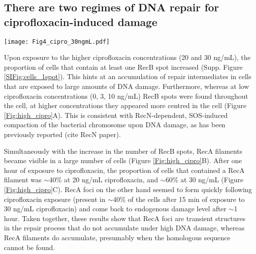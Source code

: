 \subsection*{There are two regimes of DNA repair for ciprofloxacin-induced damage}

\begin{figure*}[htbp]
\begin{center}
\texttt{[image: Fig4\_cipro\_30ngmL.pdf]}
\end{center}
\caption{}
\label{Fig:high_cipro}
\end{figure*}


Upon exposure to the higher ciprofloxacin concentrations (20 and 30 ng/mL), the proportion of cells that contain at least one RecB spot increased (Supp. Figure \ref{SIFig:cells_1spot}). This hints at an accumulation of repair intermediates in cells that are exposed to large amounts of DNA damage. Furthermore, whereas at low ciprofloxacin concentrations (0, 3, 10 ng/mL) RecB spots were found throughout the cell, at higher concentrations they appeared more centred in the cell (Figure \ref{Fig:high_cipro}A). This is consistent with RecN-dependent, SOS-induced compaction of the bacterial chromosome upon DNA damage, as has been previously reported (cite RecN paper).

Simultaneously with the increase in the number of RecB spots, RecA filaments became visible in a large number of cells (Figure \ref{Fig:high_cipro}B). After one hour of exposure to ciprofloxacin, the proportion of cells that contained a RecA filament was $\sim$40\% at 20 ng/mL ciprofloxacin, and $\sim$60\% at 30 ng/mL (Figure \ref{Fig:high_cipro}C). RecA foci on the other hand seemed to form quickly following ciprofloxacin exposure (present in $\sim$40\% of the cells after 15 min of exposure to 30 ng/mL ciprofloxacin) and come back to endogenous damage level after $\sim$1 hour. Taken together, these results show that RecA foci are transient structures in the repair process that do not accumulate under high DNA damage, whereas RecA filaments do accumulate, presumably when the homologous sequence cannot be found.

